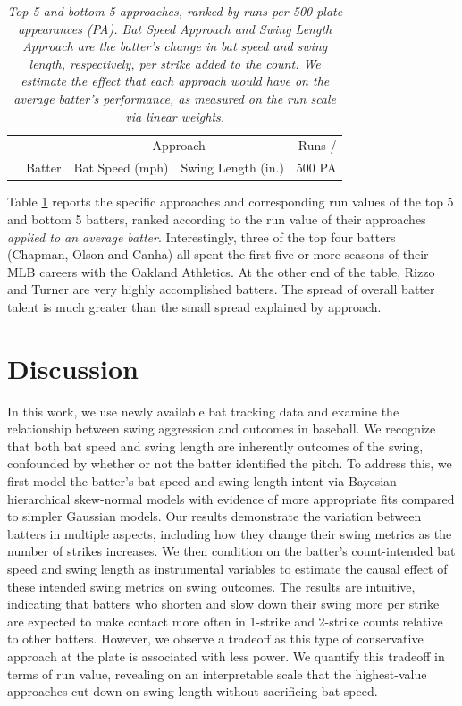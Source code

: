 \documentclass{article}
\begin{document}
      \begin{table}[H]
        \centering
        \begin{tabular}{rl|rr|r}
          &        & \multicolumn{2}{c|}{Approach}          & Runs /\\
          & Batter & Bat Speed (mph)  & Swing Length (in.)  & 500 PA\\
          \hline
          
        \end{tabular}
        \caption{\it Top 5 and bottom 5 approaches, ranked by runs per 500 plate appearances (PA). Bat Speed Approach and Swing Length Approach are the batter's change in bat speed and swing length, respectively, per strike added to the count. We estimate the effect that each approach would have on the average batter's performance, as measured on the run scale via linear weights.}
        \label{tab:approach-ranked}
      \end{table}

      Table \ref{tab:approach-ranked} reports the specific approaches and corresponding run values of the top 5 and bottom 5 batters, ranked according to the run value of their approaches {\it applied to an average batter}. Interestingly, three of the top four batters (Chapman, Olson and Canha) all spent the first five or more seasons of their MLB careers with the Oakland Athletics. At the other end of the table, Rizzo and Turner are very highly accomplished batters. The spread of overall batter talent is much greater than the small spread explained by approach.

    
  \section{Discussion}
  \label{sec:discussion}


    In this work, we use newly available bat tracking data and examine the relationship between swing aggression and outcomes in baseball. We recognize that both bat speed and swing length are inherently outcomes of the swing, confounded by whether or not the batter identified the pitch. To address this, we first model the batter's bat speed and swing length intent via Bayesian hierarchical skew-normal models with evidence of more appropriate fits compared to simpler Gaussian models. Our results demonstrate the variation between batters in multiple aspects, including how they change their swing metrics as the number of strikes increases. We then condition on the batter's count-intended bat speed and swing length as instrumental variables to estimate the causal effect of these intended swing metrics on swing outcomes. The results are intuitive, indicating that batters who shorten and slow down their swing more per strike are expected to make contact more often in 1-strike and 2-strike counts relative to other batters. However, we observe a tradeoff as this type of conservative approach at the plate is associated with less power. We quantify this tradeoff in terms of run value, revealing on an interpretable scale that the highest-value approaches cut down on swing length without sacrificing bat speed. 
\end{document}
